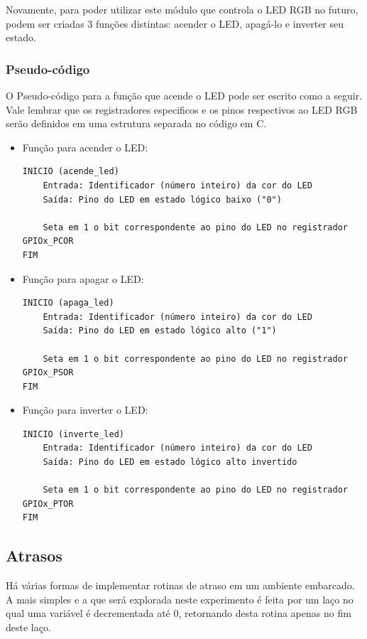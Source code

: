 \documentclass{article}
\begin{document}
Novamente, para poder utilizar este módulo que controla o LED RGB no futuro, podem ser criadas 3 funções distintas: acender o LED, apagá-lo e inverter seu estado.

\subsubsection{Pseudo-código}

O Pseudo-código para a função que acende o LED pode ser escrito como a seguir. Vale lembrar que os registradores especificos e os pinos respectivos ao LED RGB serão definidos em uma estrutura separada no código em C.

\begin{itemize}
\item Função para acender o LED:
\begin{verbatim}
INICIO (acende_led)
    Entrada: Identificador (número inteiro) da cor do LED
    Saída: Pino do LED em estado lógico baixo ("0")

    Seta em 1 o bit correspondente ao pino do LED no registrador GPIOx_PCOR
FIM
\end{verbatim}

\item Função para apagar o LED:
\begin{verbatim}
INICIO (apaga_led)
    Entrada: Identificador (número inteiro) da cor do LED
    Saída: Pino do LED em estado lógico alto ("1")

    Seta em 1 o bit correspondente ao pino do LED no registrador GPIOx_PSOR
FIM
\end{verbatim}

\item Função para inverter o LED:
\begin{verbatim}
INICIO (inverte_led)
    Entrada: Identificador (número inteiro) da cor do LED
    Saída: Pino do LED em estado lógico alto invertido

    Seta em 1 o bit correspondente ao pino do LED no registrador GPIOx_PTOR
FIM
\end{verbatim}
\end{itemize}

\subsection{Atrasos}

Há várias formas de implementar rotinas de atraso em um ambiente embarcado. A mais simples e a que será explorada neste experimento é feita por um laço no qual uma variável é decrementada até 0, retornando desta rotina apenas no fim deste laço.
\end{document}

